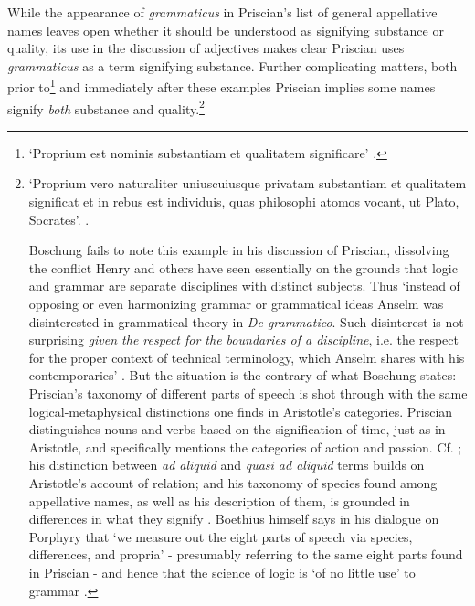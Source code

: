 \documentclass[]{article}
\begin{document}
While the appearance of \textit{grammaticus} in Priscian's list of general appellative names leaves open whether it should be understood as signifying substance or quality, its use in the discussion of adjectives makes clear Priscian uses \textit{grammaticus} as a term signifying substance. Further complicating matters, both prior to\footnote{`Proprium est nominis substantiam et qualitatem significare' \cite[\textit{inst. gram.} II, p. 55]{inst.gram.}.} and immediately after these examples Priscian implies some names signify \textit{both} substance and quality.\footnote{`Proprium vero naturaliter uniuscuiusque privatam substantiam et qualitatem significat et in rebus est individuis, quas philosophi atomos vocant, ut Plato, Socrates'. \cite[\textit{inst. gram.} II, pp. 58-59]{inst.gram.}. 

Boschung fails to note this example in his discussion of Priscian, dissolving the conflict Henry and others have seen essentially on the grounds that logic and grammar are separate disciplines with distinct subjects. Thus `instead of opposing or even harmonizing grammar or grammatical ideas Anselm was disinterested in grammatical theory in \textit{De grammatico}. Such disinterest is not surprising \textit{given the respect for the boundaries of a discipline}, i.e. the respect for the proper context of technical terminology, which Anselm shares with his contemporaries' \cite[p. 205; see also p. 219]{Boschung2006}. But the situation is the contrary of what Boschung states: Priscian's taxonomy of different parts of speech is shot through with the same logical-metaphysical distinctions one finds in Aristotle's categories. Priscian distinguishes nouns and verbs based on the signification of time, just as in Aristotle, and specifically mentions the categories of action and passion. Cf. \cite[\textit{inst. gram.} VIII, p. 369]{inst.gram.} \cite[BDI 306B]{BDI1}; his distinction between \textit{ad aliquid} and \textit{quasi ad aliquid} terms builds on Aristotle's account of relation; and his taxonomy of species found among appellative names, as well as his description of them, is grounded in differences in what they signify \cite[\textit{inst. gram.} II, p. 60]{inst.gram.}. Boethius himself says in his dialogue on Porphyry that `we measure out the eight parts of speech via species, differences, and propria'  - presumably referring to the same eight parts found in Priscian - and hence that the science of logic is `of no little use' to grammar \cite[BDP 12C]{BDP}.}
\end{document}
